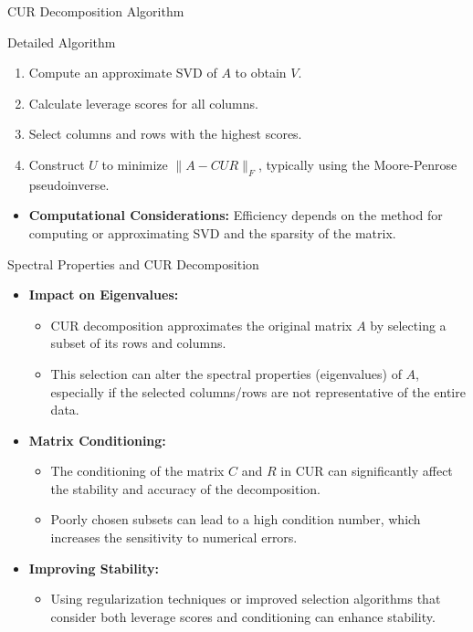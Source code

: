 \documentclass[pdf]{beamer}
\begin{document}
\begin{frame}{CUR Decomposition Algorithm}
    \begin{block}{Detailed Algorithm}
        \begin{enumerate}
            \item Compute an approximate SVD of \( A \) to obtain \( V \).
            \item Calculate leverage scores for all columns.
            \item Select columns and rows with the highest scores.
            \item Construct \( U \) to minimize \( \| A - CUR \|_F \), typically using the Moore-Penrose pseudoinverse.
        \end{enumerate}
    \end{block}
    \begin{itemize}
        \item \textbf{Computational Considerations:} Efficiency depends on the method for computing or approximating SVD and the sparsity of the matrix.
    \end{itemize}
\end{frame}

\begin{frame}{Spectral Properties and CUR Decomposition}
    \begin{itemize}
        \item \textbf{Impact on Eigenvalues:}
            \begin{itemize}
                \item CUR decomposition approximates the original matrix \( A \) by selecting a subset of its rows and columns.
                \item This selection can alter the spectral properties (eigenvalues) of \( A \), especially if the selected columns/rows are not representative of the entire data.
            \end{itemize}
        \item \textbf{Matrix Conditioning:}
            \begin{itemize}
                \item The conditioning of the matrix \( C \) and \( R \) in CUR can significantly affect the stability and accuracy of the decomposition.
                \item Poorly chosen subsets can lead to a high condition number, which increases the sensitivity to numerical errors.
            \end{itemize}
        \item \textbf{Improving Stability:}
            \begin{itemize}
                \item Using regularization techniques or improved selection algorithms that consider both leverage scores and conditioning can enhance stability.
            \end{itemize}
    \end{itemize}
\end{frame}
\end{document}
